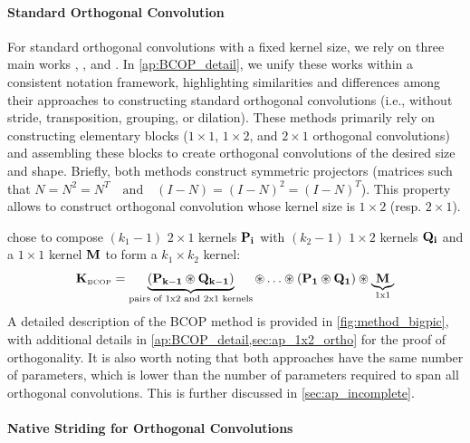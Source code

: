\paragraph{Standard Orthogonal Convolution}\label{sec:standard}  
    For standard orthogonal convolutions with a fixed kernel size, we rely on three main works \cite{xiao_dynamical_2018}, \cite{li_preventing_2019}, and \cite{su_scaling-up_2021}. In \cref{ap:BCOP_detail}, we unify these works within a consistent notation framework, highlighting similarities and differences among their approaches to constructing standard orthogonal convolutions (i.e., without stride, transposition, grouping, or dilation). These methods primarily rely on constructing elementary blocks ($1 \times 1$, $1 \times 2$, and $2 \times 1$ orthogonal convolutions) and assembling these blocks to create orthogonal convolutions of the desired size and shape. 
    Briefly, both methods construct symmetric projectors (matrices such that $N = N^2 = N^T \quad \text{and} \quad (I - N) = (I - N)^2 = (I - N)^T$). This property allows to construct orthogonal convolution whose kernel size is $1\times 2$ (resp. $2\times 1$).

    \cite{li_preventing_2019, xiao_dynamical_2018} chose to compose $(k_1-1)$ $2 \times 1$ kernels $\mathbf{P_i}$ with $(k_2-1)$ $1 \times 2$ kernels $\mathbf{Q_i}$ and a $1 \times 1$ kernel $\mathbf{M}$ to form a $k_1 \times k_2$ kernel:
    \[
        \kernel{K}_{\text{\tiny{BCOP}}} = \underbrace{(\kernel{P_{k-1}} \mathbconv \kernel{Q_{k-1}})}_{\text{pairs of 1x2 and 2x1 kernels}} \mathbconv \dots \mathbconv (\kernel{P_1} \mathbconv \kernel{Q_1}) \mathbconv \underbrace{\kernel{M}}_{\text{1x1}}
    \] 
     A detailed description of the BCOP method is provided in \cref{fig:method_bigpic}, with additional details in  \cref{ap:BCOP_detail,sec:ap_1x2_ortho} for the proof of orthogonality.
    It is also worth noting that both approaches have the same number of parameters, which is lower than the number of parameters required to span all orthogonal convolutions. This is further discussed in  \cref{sec:ap_incomplete}.


\paragraph{Native Striding for Orthogonal Convolutions}\label{sec:stride}

